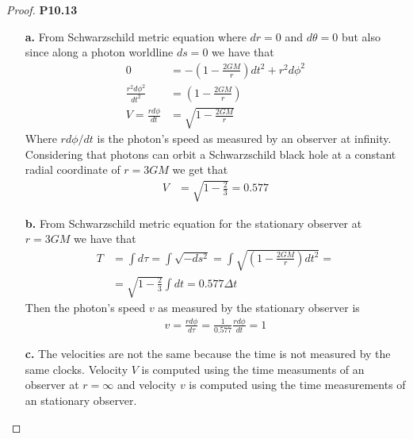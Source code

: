 \documentclass[11pt]{article}
\theoremstyle{definition}
\begin{document}
\begin{proof}{\textbf{P10.13}}
\begin{itemize}
    \item [\textbf{a.}] From Schwarzschild metric equation where $dr = 0$ and
    $d\theta = 0$ but also since along a photon worldline $ds = 0$ we have that
    \begin{align*}
        0 &= -\left(1 - \frac{2GM}{r}\right)dt^2 + r^2d\phi^2\\
        \frac{r^2d\phi^2}{dt^2} &= \left(1 - \frac{2GM}{r}\right)\\
        V =\frac{rd\phi}{dt} &= \sqrt{1 - \frac{2GM}{r}}
    \end{align*}
    Where $rd\phi/dt$ is the photon's speed as measured by an observer at
    infinity. Considering that photons can orbit a Schwarzschild black hole at
    a constant radial coordinate of $r = 3GM$ we get that
    \begin{align*}
        V &= \sqrt{1 - \frac{2}{3}} = 0.577
    \end{align*}
    \item [\textbf{b.}] From Schwarzschild metric equation for the stationary
    observer at $r = 3GM$ we have that
    \begin{align*}
        T &= \int d\tau = \int \sqrt{-ds^2}
        = \int \sqrt{\left(1 - \frac{2GM}{r}\right)dt^2} = \\
        &= \sqrt{1 - \frac{2}{3}} \int dt = 0.577 \Delta t
    \end{align*}
    Then the photon's speed $v$ as measured by the stationary observer is
    \begin{align*}
        v = \frac{rd\phi }{d\tau} = \frac{1}{0.577}\frac{rd\phi }{dt} = 1
    \end{align*}
    \item [\textbf{c.}] The velocities are not the same because the time is
    not measured by the same clocks. Velocity $V$ is computed using the
    time measuments of an observer at $r = \infty$ and velocity $v$ is
    computed using the time measurements of an stationary observer.
\end{itemize}
\end{proof}
\cleardoublepage
\end{document}
